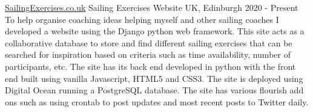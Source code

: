 \cventry
{\href{www.sailingexercises.co.uk}{SailingExercises.co.uk}}
{Sailing Exercises Website}
{UK, Edinburgh}
{2020 - Present}
{
    To help organise coaching ideas helping myself and other sailing coaches 
    I developed a website using the Django python web framework. This site 
    acts as a collaborative database to store and find different sailing 
    exercises that can be searched for inspiration based on criteria such as 
    time availability, number of participants, etc. The site has its back end 
    developed in python with the front end built using vanilla Javascript, 
    HTML5 and CSS3. The site is deployed using Digital Ocean running a 
    PostgreSQL database. The site has various flourish add ons such as using 
    crontab to post updates and most recent posts to Twitter daily.\newline
}
